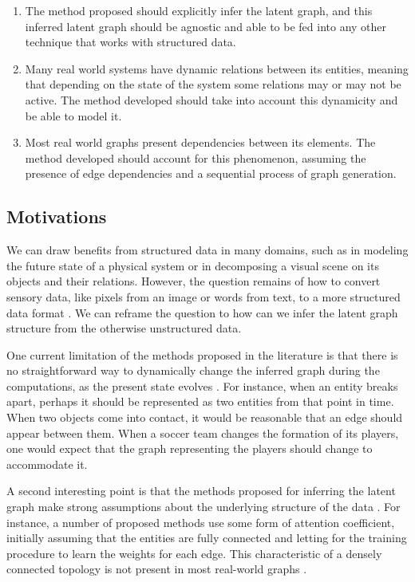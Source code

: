 \documentclass[12pt,a4paper]{article}
\begin{document}
	\begin{enumerate}
		\item The method proposed should explicitly infer the latent graph, and this inferred latent graph should be agnostic and able to be fed into any other technique that works with structured data.
		\item Many real world systems have dynamic relations between its entities, meaning that depending on the state of the system some relations may or may not be active. The method developed should take into account this dynamicity and be able to model it.
		\item Most real world graphs present dependencies between its elements. The method developed should account for this phenomenon, assuming the presence of edge dependencies and a sequential process of graph generation.
	\end{enumerate}
	
	\subsection{Motivations}
	
	We can draw benefits from structured data in many domains, such as in modeling the future state of a physical system or in decomposing a visual scene on its objects and their relations. However, the question remains of how to convert sensory data, like pixels from an image or words from text, to a more structured data format \citep{Battaglia2018}.  We can reframe the question to how can we infer the latent graph structure from the otherwise unstructured data.
	
	One current limitation of the methods proposed in the literature is that there is no straightforward way to dynamically change the inferred graph during the computations, as the present state evolves \citep{Battaglia2018}. For instance, when an entity breaks apart, perhaps it should be represented as two entities from that point in time. When two objects come into contact, it would be reasonable that an edge should appear between them. When a soccer team changes the formation of its players, one would expect that the graph representing the players should change to accommodate it.
	
	A second interesting point is that the methods proposed for inferring the latent graph make strong assumptions about the underlying structure of the data \citep{Hamilton2020}. For instance, a number of proposed methods \citep{Watters2017, VanSteenkiste2018} use some form of attention coefficient, initially assuming that the entities are fully connected and letting for the training procedure to learn the weights for each edge. This characteristic of a densely connected topology is not present in most real-world graphs \citep{Newman2019}.
	
\end{document}
